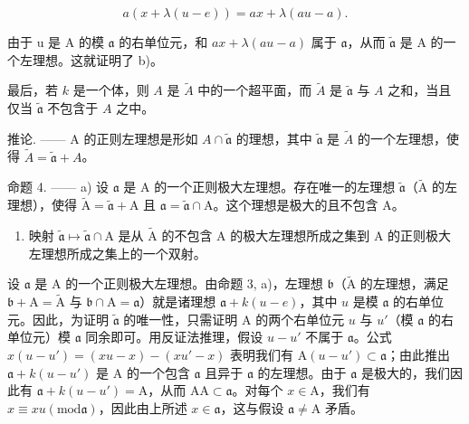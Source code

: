 \[
a (x + \lambda (u - e)) = a x + \lambda (a u - a).
\]

由于 u 是 A 的模 \(\mathfrak{a}\) 的右单位元，和 \(ax + \lambda(au - a)\) 属于 \(\mathfrak{a}\)，从而 \(\widetilde{\mathfrak{a}}\) 是 A 的一个左理想。这就证明了 b)。

最后，若 \(k\) 是一个体，则 \(A\) 是 \(\widetilde{A}\) 中的一个超平面，而 \(\widetilde{A}\) 是 \(\widetilde{\mathfrak{a}}\) 与 \(A\) 之和，当且仅当 \(\widetilde{\mathfrak{a}}\) 不包含于 \(A\) 之中。

推论. —— A 的正则左理想是形如 \(A \cap \widetilde{\mathfrak{a}}\) 的理想，其中 \(\widetilde{\mathfrak{a}}\) 是 \(\widetilde{A}\) 的一个左理想，使得 \(\widetilde{A} = \widetilde{\mathfrak{a}} + A\)。

命题 4. —— a) 设 \(\mathfrak{a}\) 是 A 的一个正则极大左理想。存在唯一的左理想 \(\widetilde{\mathfrak{a}}\)（\(\widetilde{\mathrm{A}}\) 的左理想），使得 \(\widetilde{\mathrm{A}} = \widetilde{\mathfrak{a}} + \mathrm{A}\) 且 \(\mathfrak{a} = \widetilde{\mathfrak{a}} \cap \mathrm{A}\)。这个理想是极大的且不包含 A。

\begin{enumerate}
\def\labelenumi{\alph{enumi})}
\setcounter{enumi}{1}
\tightlist
\item
  映射 \(\widetilde{\mathfrak{a}}\mapsto \widetilde{\mathfrak{a}}\cap \mathrm{A}\) 是从 \(\widetilde{\mathrm{A}}\) 的不包含 A 的极大左理想所成之集到 A 的正则极大左理想所成之集上的一个双射。
\end{enumerate}

设 \(\mathfrak{a}\) 是 A 的一个正则极大左理想。由命题 3, a)，左理想 \(\mathfrak{b}\)（\(\widetilde{\mathrm{A}}\) 的左理想，满足 \(\mathfrak{b} + \mathrm{A} = \widetilde{\mathrm{A}}\) 与 \(\mathfrak{b} \cap \mathrm{A} = \mathfrak{a}\)）就是诸理想 \(\mathfrak{a} + k(u - e)\)，其中 \(u\) 是模 \(\mathfrak{a}\) 的右单位元。因此，为证明 \(\widetilde{\mathfrak{a}}\) 的唯一性，只需证明 A 的两个右单位元 \(u\) 与 \(u'\)（模 \(\mathfrak{a}\) 的右单位元）模 \(\mathfrak{a}\) 同余即可。用反证法推理，假设 \(u - u'\) 不属于 \(\mathfrak{a}\)。公式 \(x(u - u') = (xu - x) - (xu' - x)\) 表明我们有 \(\mathrm{A}(u - u') \subset \mathfrak{a}\)；由此推出 \(\mathfrak{a} + k(u - u')\) 是 A 的一个包含 \(\mathfrak{a}\) 且异于 \(\mathfrak{a}\) 的左理想。由于 \(\mathfrak{a}\) 是极大的，我们因此有 \(\mathfrak{a} + k(u - u') = \mathrm{A}\)，从而 \(\mathrm{AA} \subset \mathfrak{a}\)。对每个 \(x \in \mathrm{A}\)，我们有 \(x \equiv xu (\mathrm{mod} \mathfrak{a})\)，因此由上所述 \(x \in \mathfrak{a}\)，这与假设 \(\mathfrak{a} \neq \mathrm{A}\) 矛盾。

